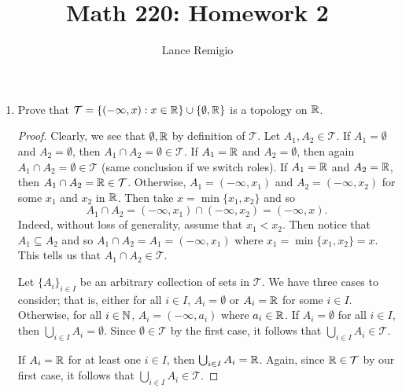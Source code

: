 \documentclass[a4paper]{article}
\title{Math 220: Homework 2}
\author{Lance Remigio}
\begin{document}
\maketitle

\rhead{\thepage}

\begin{problem}
    \begin{enumerate}
        \item[(i)] Prove that \( \mathcal{T} = \{  (-\infty , x ) : x \in \mathbb{R} \}  \cup \{ \emptyset, \mathbb{R}  \}    \) is a topology on \( \mathbb{R}  \).
            \begin{proof}
            Clearly, we see that \( \emptyset, \mathbb{R}  \) by definition of \( \mathcal{T} \). 
            Let \( {A}_{1}, {A}_{2} \in \mathcal{T} \). If \( {A}_{1} = \emptyset  \) and \( {A}_{2} = \emptyset  \), then \( {A}_{1} \cap {A}_{2} = \emptyset \in \mathcal{T} \). If \( {A}_{1} = \mathbb{R}  \) and \( {A}_{2} = \emptyset  \), then again \( {A}_{1} \cap {A}_{2} = \emptyset \in \mathcal{T} \) (same conclusion if we switch roles). If \( {A}_{1} = \mathbb{R}  \) and \( {A}_{2} = \mathbb{R}   \), then \( {A}_{1} \cap {A}_{2} = \mathbb{R} \in \mathcal{T} \). Otherwise, \( {A}_{1} = (-\infty , {x}_{1}) \) and \( {A}_{2} = (- \infty  , {x}_{2} ) \) for some \( {x}_{1} \) and \( {x}_{2}  \) in \( \mathbb{R}  \). Then take \( x = \min \{  {x}_{1}, {x}_{2} \}  \) and so  
            \[  {A}_{1} \cap {A}_{2} = (-\infty , {x}_{1}) \cap (-\infty , {x}_{2}) = (- \infty , x). \]
            Indeed, without loss of generality, assume that \( {x}_{1} < {x}_{2} \). Then notice that \( {A}_{1} \subseteq {A}_{2} \) and so \( {A}_{1} \cap {A}_{2} = {A}_{1} =  (-\infty , {x}_{1} ) \) where \( {x}_{1} = \min \{ {x}_{1}, {x}_{2} \} = x   \).
            This tells us that \( {A}_{1} \cap {A}_{2} \in \mathcal{T}  \).

            Let \( \{ {A}_{i} \}_{i \in I} \) be an arbitrary collection of sets in \( \mathcal{T} \). We have three cases to consider; that is, either for all \( i \in I  \), \( {A}_{i} = \emptyset \) or \( {A}_{i} = \mathbb{R}  \) for some \( i \in I  \). Otherwise, for all \( i \in \mathbb{N}  \), \( {A}_{i} = (-\infty , {a}_{i})  \) where \( {a}_{i} \in \mathbb{R}  \).
            If \( {A}_{i} = \emptyset  \) for all \( i \in I \), then \( \bigcup_{ i \in I  }^{  }  {A}_{i} = \emptyset   \). Since \( \emptyset \in \mathcal{T} \) by the first case, it follows that \( \bigcup_{ i \in I  }^{  } {A}_{i} \in \mathcal{T} \).

            If \( {A}_{i} = \mathbb{R}  \) for at least one \( i \in I  \), then \( \bigcup_{ i \in I  }^{  }  {A}_{i} = \mathbb{R}  \). Again, since \( \mathbb{R} \in \mathcal{T} \) by our first case, it follows that \( \bigcup_{ i \in I  }^{  }  {A}_{i} \in \mathcal{T} \).  


\end{proof}
\end{enumerate}
\end{problem}
\end{document}
